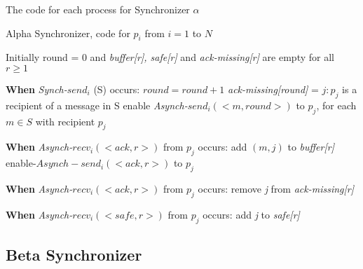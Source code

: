 The code for each process for Synchronizer $\alpha$ 



\begin{algorithm}
 \caption{Alpha Synchronizer, code for $p_i$ from $i = 1$ to $N$}
 \label{algorithm:alpha} 

\SetAlgoNoLine

Initially round = 0 and \newline
\textit{buffer[r], safe[r]} and \textit{ack-missing[r]} are empty for all $r \geq 1$ \newline

\textbf{When} \textit{Synch-}$send_i$ (S) occurs:\newline
$round = round + 1$ \newline
\textit{ack-missing[round]} = {$j:p_j$ is a recipient of a message in S} \newline
enable \textit{Asynch-}$send_i(<m,round>)$  to $p_j$, for each $m \in S$ with recipient $p_j$ \newline

\textbf{When} \textit{Asynch-}$recv_i(<ack,r>)$ from $p_j$ occurs: \newline
add $(m,j)$ to \textit{buffer[r]} \newline
enable-$Asynch-send_i(<ack,r>)$ to $p_j$ \newline

\textbf{When} \textit{Asynch-}$recv_i(<ack,r>)$ from $p_j$ occurs: \newline
remove \textit{j} from \textit{ack-missing[r]} \newline
{}

\textbf{When} \textit{Asynch-}$recv_i(<safe,r>)$ from $p_j$ occurs: \newline
add \textit{j} to \textit{safe[r]} \newline
{}

\end{algorithm}

\subsection{Beta Synchronizer}



